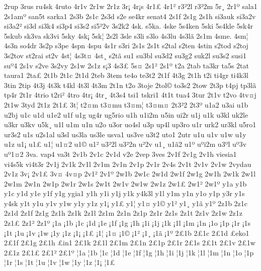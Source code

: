 {2rup
3rus
ru4sk
4ruto
4r1v
2r1w
2r1z
3r^^a1
4r^^a1s
4r1^^a3
4r1^^b2
r3^^b22l
r3^^b22m
5r^^b8
2r1^^ba
sala1
2s1am^^ba
san5t
sarka1
2s3b
2s1c
2s3d
s2e
se4kr
senat4
2s1f
2s1g
2s1h
si3auk
si3a2v
si3a2^^b2
si3d
si3k4
si3p4
si3s2
si5^^b22v
3s2k2
4sk.
s5ka.
4ske
5s4ken
5ski
5s4kle
5sk4r
5skub
sk3va
sk3vi
5sky
4sk^^a1
5sk^^a6
2s2l
3sle
s3li
s3lo
4s3lu
4s3l^^e3
2s1m
4sme.
4sm^^a6
4s3n
so4dr
3s2p
s3pe
4spn
4spu
4s1r
s3ri
2s1s
2s1t
s2tal
s2ten
4stin
s2tod
s2toj
3s2tov
st2rai
st2v
4st^^a6
4s3t^^a4
4st^^b8
s2t^^e3
su1
su3bl
su3d2
su3g2
suk2l
su3s2
susi1
su^^ba4
2s1v
s2ve
3s2vy
2s1w
2s1z
s^^a13
4s3^^a3
5s^^a4
2s1^^b2
2s1^^ba
t2a
2tab
ta3kr
ta5s
2tat
taura1
2ta^^a3
2t1b
2t1c
2t1d
2teb
3tem
te4o
te3t2
2t1f
4t3g
2t1h
t2i
ti4gr
ti4k3l
3tin
2tip
4t3j
4t3k
t4kl
4t3l
4t3m
2t1n
t2o
3toje
2tol^^a9
to3s2
2tow
2t3p
t4pj
tp3l^^e3
tp4r
2t1r
4trio
t2ri^^b2
4tro
4tr^^a1
4tr^^b8
4t3s4
tsi1
tskri1
4t1t
tua4
3tur
2t1v
t2vo
4tv^^a4j
2t1w
3tyd
2t1z
2t1^^a3
3t^^a6
t2^^a4m
t3^^a4mu
t3^^a4m^^a6
t3^^a4m^^a4
2t3^^b22
2t3^^ba
u1a2
u3ai
u1b
u2bj
u1c
u1d
u1e2
u1f
u1g
ug4r
ug5rio
u1h
u1i2m
u5in
ui2r
u1j
u1k
u3kl
uk2le
u3kr
u3kv
u5k^^b8
u1l
u1m
u1n
u2o
u3or
uo4sl
u3p
up4l
up3ro
u1r
urk2
ur3kl
u5ro1
ur3s2
u1s
u2s1al
u3sl
us3la
us3le
usva1
us3ve
u3t2
uto1
2utr
u1u
u1v
u1w
u1y
u1z
u1^^a1
u1^^a3
u1^^a6
u1^^a42
u1^^a9
u1^^b2
u3^^b22l
u3^^b22n
u^^b22v
u1^^b8
u1^^e32
u1^^ba
u^^bai2m
u3^^bal
u^^ba3v
u^^ba1^^a42
3va.
vap4
va3t
2v1b
2v1c
2v1d
v2e
2vep
3ves
2v1f
2v1g
2v1h
viesia1
vi4s5k
vi4t3r
2v1j
2v1k
2v1l
2v1m
2v1n
2v1p
2v1r
2v4s
2v1t
2v1v
2v1w
2vydau
2v1z
3v^^a1
2v1^^a3
3v^^a4
4v^^a4p
2v1^^b2
2v1^^ba
2w1b
2w1c
2w1d
2w1f
2w1g
2w1h
2w1k
2w1l
2w1m
2w1n
2w1p
2w1r
2w1s
2w1t
2w1v
2w1w
2w1z
2w1^^a3
2w1^^b2
2w1^^ba
y1a
y1b
y1c
y1d
y1e
y1f
y1g
ygia1
y1h
y1i
y1j
y1k
y4k3l
y1l
y1m
y1n
y1o
y1p
y3r
y1s
y4sk
y1t
y1u
y1v
y1w
y1y
y1z
y1^^a1
y1^^a3
y1^^a6
y1^^a4
y1^^a9
y1^^b2
y1^^b8
y1^^e3
y1^^ba
2z1b
2z1c
2z1d
2z1f
2z1g
2z1h
2z1k
2z1l
2z1m
2z1n
2z1p
2z1r
2z1s
2z1t
2z1v
2z1w
2z1z
2z1^^a3
2z1^^b2
2z1^^ba
^^a11a
^^a11b
^^a11c
^^a11d
^^a11e
^^a11f
^^a11g
^^a11h
^^a11i
^^a11j
^^a11k
^^a11l
^^a11m
^^a11n
^^a11o
^^a11p
^^a11r
^^a11s
^^a11t
^^a11u
^^a11v
^^a11w
^^a11y
^^a11z
^^a11^^a1
^^a11^^a3
^^a11^^a6
^^a11^^a4
^^a11^^a9
^^a11^^b2
^^a11^^b8
^^a11^^e3
^^a11^^ba
2^^a31b
2^^a31c
2^^a31d
^^a3eko1
2^^a31f
2^^a31g
2^^a31h
^^a3in1
2^^a31k
2^^a31l
2^^a31m
2^^a31n
2^^a31p
2^^a31r
2^^a31s
2^^a31t
2^^a31v
2^^a31w
2^^a31z
2^^a31^^a3
2^^a31^^b2
2^^a31^^ba
^^a61a
^^a61b
^^a61c
^^a61d
^^a61e
^^a61f
^^a61g
^^a61h
^^a61i
^^a61j
^^a61k
^^a61l
^^a61m
^^a61n
^^a61o
^^a61p
^^a61r
^^a61s
^^a61t
^^a61u
^^a61v
^^a61w
^^a61y
^^a61z
^^a61^^a1
^^a61^^a3
}
